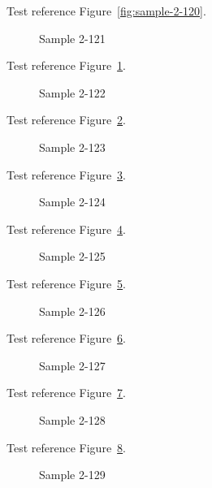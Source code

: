 Test reference Figure~\ref{fig:sample-2-120}.

\begin{figure}[tbhp]
\caption{Sample 2-121}
\label{fig:sample-2-121}
\end{figure}

Test reference Figure~\ref{fig:sample-2-121}.

\begin{figure}[tbhp]
\caption{Sample 2-122}
\label{fig:sample-2-122}
\end{figure}

Test reference Figure~\ref{fig:sample-2-122}.

\begin{figure}[tbhp]
\caption{Sample 2-123}
\label{fig:sample-2-123}
\end{figure}

Test reference Figure~\ref{fig:sample-2-123}.

\begin{figure}[tbhp]
\caption{Sample 2-124}
\label{fig:sample-2-124}
\end{figure}

Test reference Figure~\ref{fig:sample-2-124}.

\begin{figure}[tbhp]
\caption{Sample 2-125}
\label{fig:sample-2-125}
\end{figure}

Test reference Figure~\ref{fig:sample-2-125}.

\begin{figure}[tbhp]
\caption{Sample 2-126}
\label{fig:sample-2-126}
\end{figure}

Test reference Figure~\ref{fig:sample-2-126}.

\begin{figure}[tbhp]
\caption{Sample 2-127}
\label{fig:sample-2-127}
\end{figure}

Test reference Figure~\ref{fig:sample-2-127}.

\begin{figure}[tbhp]
\caption{Sample 2-128}
\label{fig:sample-2-128}
\end{figure}

Test reference Figure~\ref{fig:sample-2-128}.

\begin{figure}[tbhp]
\caption{Sample 2-129}
\label{fig:sample-2-129}
\end{figure}

